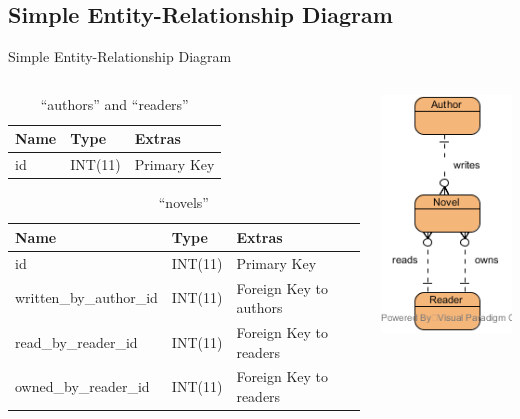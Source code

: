 \documentclass{beamer}
\begin{document}
	\subsection{Simple Entity-Relationship Diagram}
	\begin{frame}{Simple Entity-Relationship Diagram}
		\begin{columns}[t,totalwidth=\textwidth]
    		    \begin{small}
                \begin{table}[]
                \centering
                \caption{``authors'' and ``readers''}
                \begin{tabular}{|l|l|l|}
                \hline
                \textbf{Name} & \textbf{Type} & \textbf{Extras} \\ \hline
                id            & INT(11)       & Primary Key     \\ \hline
                \end{tabular}
                \end{table}
                \begin{table}[]
                \centering
                \caption{``novels''}
                \begin{tabular}{|l|l|l|}
                \hline
                \textbf{Name}           & \textbf{Type} & \textbf{Extras}        \\ \hline
                id                      & INT(11)       & Primary Key            \\ \hline
                written\_by\_author\_id & INT(11)       & Foreign Key to authors \\ \hline
                read\_by\_reader\_id    & INT(11)       & Foreign Key to readers \\ \hline
                owned\_by\_reader\_id   & INT(11)       & Foreign Key to readers \\ \hline                
                \end{tabular}
                \end{table}
                \end{small}
				\begin{flushright}
					\includegraphics[scale=0.6]{img/02_simple_erd}
				\end{flushright}
		\end{columns}
	\end{frame}
	
\end{document}
